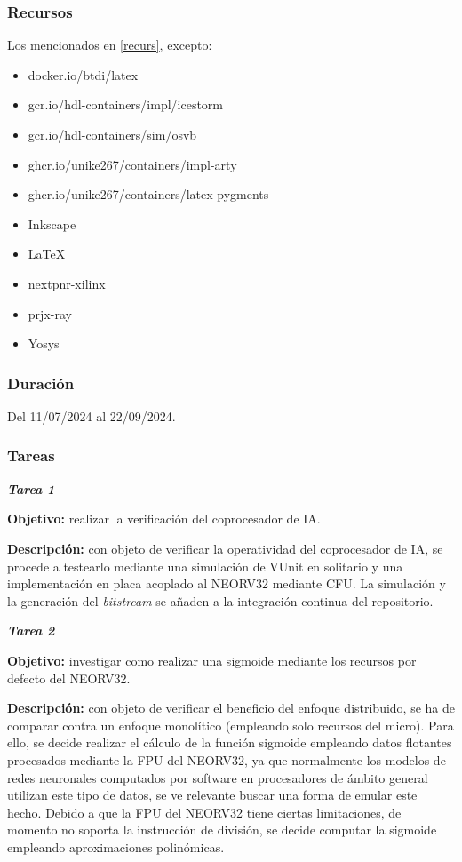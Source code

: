 \subsubsection{Recursos}

Los mencionados en \ref{recurs}, excepto:

\begin{itemize}
    \item docker.io/btdi/latex
    \item gcr.io/hdl-containers/impl/icestorm
    \item gcr.io/hdl-containers/sim/osvb
    \item ghcr.io/unike267/containers/impl-arty
    \item ghcr.io/unike267/containers/latex-pygments
    \item Inkscape
    \item \LaTeX
    \item nextpnr-xilinx
    \item prjx-ray
    \item Yosys
\end{itemize}

\subsubsection{Duración}

Del 11/07/2024 al 22/09/2024.

\subsubsection{Tareas}

\noindent \textbf{\textit{Tarea 1}}

\textbf{Objetivo:} realizar la verificación del coprocesador de IA. 

\textbf{Descripción:} con objeto de verificar la operatividad del coprocesador de IA, se procede a testearlo mediante una simulación de VUnit en solitario y una implementación en placa acoplado al NEORV32 mediante CFU.
La simulación y la generación del \textit{bitstream} se añaden a la integración continua del repositorio. 

\noindent \textbf{\textit{Tarea 2}}

\textbf{Objetivo:} investigar como realizar una sigmoide mediante los recursos por defecto del NEORV32. 

\textbf{Descripción:} con objeto de verificar el beneficio del enfoque distribuido, se ha de comparar contra un enfoque monolítico (empleando solo recursos del micro).
Para ello, se decide realizar el cálculo de la función sigmoide empleando datos flotantes procesados mediante la FPU del NEORV32, ya que normalmente los modelos de redes neuronales computados por software en procesadores de ámbito general utilizan este tipo de datos, se ve relevante buscar una forma de emular este hecho. 
Debido a que la FPU del NEORV32 tiene ciertas limitaciones, de momento no soporta la instrucción de división, se decide computar la sigmoide empleando aproximaciones polinómicas.

